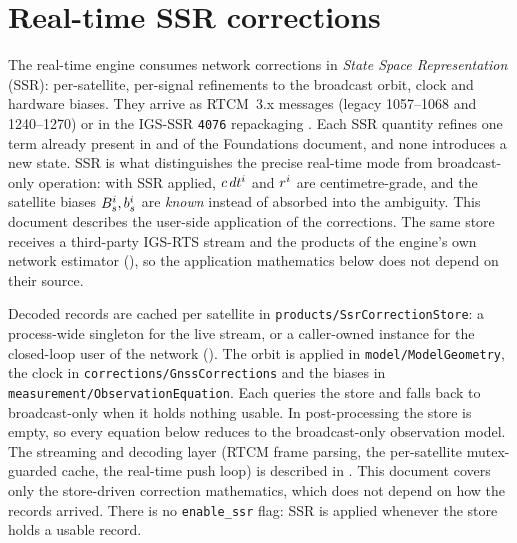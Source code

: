 \documentclass[main.tex]{subfiles}
\begin{document}
\section{Real-time SSR corrections}\label{sec:ssr}

The real-time engine consumes network corrections in \emph{State Space
Representation} (SSR): per-satellite, per-signal refinements to the
broadcast orbit, clock and hardware biases. They arrive as RTCM~3.x
messages (legacy 1057--1068 and 1240--1270) or in the IGS-SSR
\texttt{4076} repackaging \cite{rtcm10403,igsssr}. Each SSR quantity
refines one term already present in
 and
 of the
Foundations document, and none introduces a new state. SSR is what
distinguishes the precise real-time mode from broadcast-only
operation: with SSR applied, $c\,dt^i$ and $r^{i}$
are centimetre-grade, and the satellite biases $B^i_s,
b^i_s$ are \emph{known} instead of absorbed into the ambiguity.
This document describes the user-side application of the corrections. The
same store receives a third-party IGS-RTS stream and the products of the
engine's own network estimator (), so the application mathematics below does not depend on their
source.

Decoded records are cached per satellite in
\texttt{products/SsrCorrectionStore}: a process-wide singleton for the
live stream, or a caller-owned instance for the closed-loop user of the
network (). The orbit is applied in
\texttt{model/ModelGeometry}, the clock in
\texttt{corrections/GnssCorrections} and the biases in
\texttt{measurement/ObservationEquation}. Each queries the store and falls
back to broadcast-only when it holds nothing usable. In post-processing the store is
empty, so every equation below reduces to the broadcast-only observation
model. The streaming and decoding layer (RTCM frame parsing, the
per-satellite mutex-guarded cache, the real-time push loop) is described in
. This document covers only
the store-driven correction mathematics, which does not depend on how the
records arrived. There is no \texttt{enable\_ssr} flag: SSR is applied
whenever the store holds a usable record.
\end{document}
